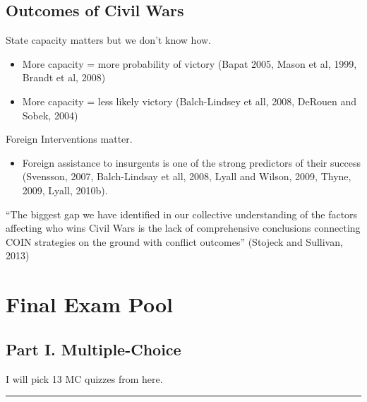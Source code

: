 \documentclass[
]{book}
\providecommand{\tightlist}{%
  \setlength{\itemsep}{0pt}\setlength{\parskip}{0pt}}
\begin{document}
\hypertarget{outcomes-of-civil-wars}{%
\section{Outcomes of Civil Wars}\label{outcomes-of-civil-wars}}

State capacity matters but we don't know how.

\begin{itemize}
\item
  More capacity = more probability of victory (Bapat 2005, Mason et al, 1999, Brandt et al, 2008)
\item
  More capacity = less likely victory (Balch-Lindsey et all, 2008, DeRouen and Sobek, 2004)
\end{itemize}

Foreign Interventions matter.

\begin{itemize}
\tightlist
\item
  Foreign assistance to insurgents is one of the strong predictors of their success (Svensson, 2007, Balch-Lindsay et all, 2008, Lyall and Wilson, 2009, Thyne, 2009, Lyall, 2010b).
\end{itemize}

``The biggest gap we have identified in our collective understanding of the factors affecting who wins Civil Wars is the lack of comprehensive conclusions connecting COIN strategies on the ground with conflict outcomes'' (Stojeck and Sullivan, 2013)

\hypertarget{final-exam-pool}{%
\chapter*{Final Exam Pool}\label{final-exam-pool}}

\hypertarget{part-i.-multiple-choice}{%
\section*{Part I. Multiple-Choice}\label{part-i.-multiple-choice}}

I will pick 13 MC quizzes from here.

\begin{center}\rule{0.5\linewidth}{0.5pt}\end{center}
\end{document}
